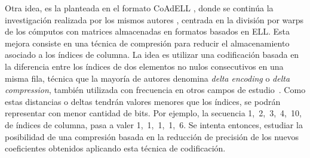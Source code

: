 Otra idea, es la planteada en el formato CoAdELL \cite{Maggioni2014}, donde se continúa la investigación realizada por los mismos autores \cite{AdELL-Maggioni2013}, centrada en la división por warps de los cómputos con matrices almacenadas en formatos basados en ELL. Esta mejora consiste en una técnica de compresión para reducir el almacenamiento asociado a los índices de columna. La idea es utilizar una codificación basada en la diferencia entre los índices de dos elementos no nulos consecutivos en una misma fila, técnica que la mayoría de autores denomina \textit{delta encoding} o \textit{delta compression}, también utilizada con frecuencia en otros campos de estudio~\cite{Ma2010}. Como estas distancias o deltas tendrán valores menores que los índices, se podrán representar con menor cantidad de bits. Por ejemplo, la secuencia 1,~2,~3,~4,~10, de índices de columna, pasa a valer 1,~1,~1,~1,~6. Se intenta entonces, estudiar la posibilidad de una compresión basada en la reducción de precisión de los nuevos coeficientes obtenidos aplicando esta técnica de codificación. %






